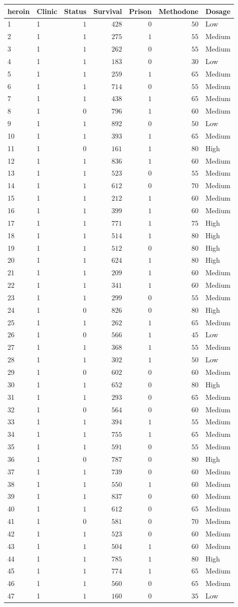 \begin{table}[!tbp]
\begin{center}
\begin{tabular}{llrrrrl}
\hline\hline
\multicolumn{1}{l}{heroin}&\multicolumn{1}{c}{Clinic}&\multicolumn{1}{c}{Status}&\multicolumn{1}{c}{Survival}&\multicolumn{1}{c}{Prison}&\multicolumn{1}{c}{Methodone}&\multicolumn{1}{c}{Dosage}\tabularnewline
\hline
1&1&$1$&$ 428$&$0$&$ 50$&Low\tabularnewline
2&1&$1$&$ 275$&$1$&$ 55$&Medium\tabularnewline
3&1&$1$&$ 262$&$0$&$ 55$&Medium\tabularnewline
4&1&$1$&$ 183$&$0$&$ 30$&Low\tabularnewline
5&1&$1$&$ 259$&$1$&$ 65$&Medium\tabularnewline
6&1&$1$&$ 714$&$0$&$ 55$&Medium\tabularnewline
7&1&$1$&$ 438$&$1$&$ 65$&Medium\tabularnewline
8&1&$0$&$ 796$&$1$&$ 60$&Medium\tabularnewline
9&1&$1$&$ 892$&$0$&$ 50$&Low\tabularnewline
10&1&$1$&$ 393$&$1$&$ 65$&Medium\tabularnewline
11&1&$0$&$ 161$&$1$&$ 80$&High\tabularnewline
12&1&$1$&$ 836$&$1$&$ 60$&Medium\tabularnewline
13&1&$1$&$ 523$&$0$&$ 55$&Medium\tabularnewline
14&1&$1$&$ 612$&$0$&$ 70$&Medium\tabularnewline
15&1&$1$&$ 212$&$1$&$ 60$&Medium\tabularnewline
16&1&$1$&$ 399$&$1$&$ 60$&Medium\tabularnewline
17&1&$1$&$ 771$&$1$&$ 75$&High\tabularnewline
18&1&$1$&$ 514$&$1$&$ 80$&High\tabularnewline
19&1&$1$&$ 512$&$0$&$ 80$&High\tabularnewline
20&1&$1$&$ 624$&$1$&$ 80$&High\tabularnewline
21&1&$1$&$ 209$&$1$&$ 60$&Medium\tabularnewline
22&1&$1$&$ 341$&$1$&$ 60$&Medium\tabularnewline
23&1&$1$&$ 299$&$0$&$ 55$&Medium\tabularnewline
24&1&$0$&$ 826$&$0$&$ 80$&High\tabularnewline
25&1&$1$&$ 262$&$1$&$ 65$&Medium\tabularnewline
26&1&$0$&$ 566$&$1$&$ 45$&Low\tabularnewline
27&1&$1$&$ 368$&$1$&$ 55$&Medium\tabularnewline
28&1&$1$&$ 302$&$1$&$ 50$&Low\tabularnewline
29&1&$0$&$ 602$&$0$&$ 60$&Medium\tabularnewline
30&1&$1$&$ 652$&$0$&$ 80$&High\tabularnewline
31&1&$1$&$ 293$&$0$&$ 65$&Medium\tabularnewline
32&1&$0$&$ 564$&$0$&$ 60$&Medium\tabularnewline
33&1&$1$&$ 394$&$1$&$ 55$&Medium\tabularnewline
34&1&$1$&$ 755$&$1$&$ 65$&Medium\tabularnewline
35&1&$1$&$ 591$&$0$&$ 55$&Medium\tabularnewline
36&1&$0$&$ 787$&$0$&$ 80$&High\tabularnewline
37&1&$1$&$ 739$&$0$&$ 60$&Medium\tabularnewline
38&1&$1$&$ 550$&$1$&$ 60$&Medium\tabularnewline
39&1&$1$&$ 837$&$0$&$ 60$&Medium\tabularnewline
40&1&$1$&$ 612$&$0$&$ 65$&Medium\tabularnewline
41&1&$0$&$ 581$&$0$&$ 70$&Medium\tabularnewline
42&1&$1$&$ 523$&$0$&$ 60$&Medium\tabularnewline
43&1&$1$&$ 504$&$1$&$ 60$&Medium\tabularnewline
44&1&$1$&$ 785$&$1$&$ 80$&High\tabularnewline
45&1&$1$&$ 774$&$1$&$ 65$&Medium\tabularnewline
46&1&$1$&$ 560$&$0$&$ 65$&Medium\tabularnewline
47&1&$1$&$ 160$&$0$&$ 35$&Low\tabularnewline

\end{tabular}
\end{center}
\end{table}
